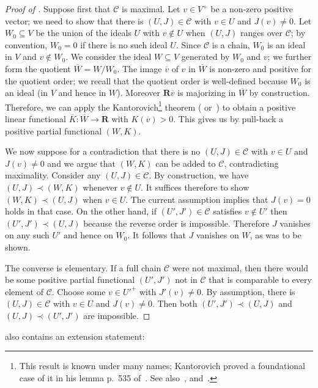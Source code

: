 \documentclass[11pt]{amsart}
\numberwithin{equation}{section}
\theoremstyle{definition}
\theoremstyle{definition}
\newcommand*{\sC}{\mathscr{C}}
\newcommand*{\RR}{\mathbf{R}}
\newcommand*{\se}{\subseteq}
\begin{document}
\begin{proof}[Proof of ]
Suppose first that $\sC$ is maximal. Let $v\in V^+$ be a non-zero positive vector; we need to show that there is $(U, J)\in\sC$ with $v\in U$ and $J(v)\neq 0$. Let $W_0\se V$ be the union of the ideals $U$ with $v\notin U$ when $(U, J)$ ranges over $\sC$; by convention, $W_0=0$ if there is no such ideal $U$. Since $\sC$ is a chain, $W_0$ is an ideal in $V$ and  $v\notin W_0$. We consider the ideal $W\se V$ generated by $W_0$ and $v$; we further form the quotient $\overline W = W/W_0$. The image $\overline v$ of $v$ in $\overline W$ is non-zero and positive for the quotient order; we recall that the quotient order is well-defined because $W_0$ is an ideal (in $V$ and hence in $W$). Moreover $\RR \overline v$ is majorizing in $\overline W$ by construction. Therefore, we can apply the Kantorovich\footnote{This result is known under many names; Kantorovich proved a foundational case of it in his lemma p.~535 of~\cite[\S4]{Kantorovic}. See also~\cite{Krein37}, \cite{Bauer57} and~\cite[\S2]{Namioka57}.} theorem (\cite[Theorem~1.6.1]{Jameson} or~\cite[Theorem~1.36]{Aliprantis-Tourky}) to obtain a positive linear functional $\overline K \colon \overline W \to\RR$ with $K(\overline v) >0$. This gives us by pull-back a positive partial functional $(W, K)$.

We now suppose for a contradiction that there is no $(U, J) \in \sC$ with $v\in U$ and $J(v) \neq 0$ and we argue that $(W, K)$ can be added to $\sC$, contradicting maximality. Consider any $(U, J)\in \sC$.  By construction, we have $(U, J) \prec (W, K)$ whenever $v\notin U$. It suffices therefore to show $(W, K) \prec (U, J)$ when $v\in U$. The current assumption implies that $J(v)=0$ holds in that case. On the other hand, if $(U', J')\in \sC$ satisfies $v\notin U'$ then $(U', J') \prec  (U, J)$ because the reverse order is impossible. Therefore $J$ vanishes on any such $U'$ and hence on $W_0$. It follows that $J$ vanishes on $W$, as was to be shown.

\smallskip
The converse is elementary. If a full chain $\sC$ were not maximal, then there would be some positive partial functional $(U', J')$ not in $\sC$ that is comparable to every element of $\sC$. Choose some $v\in {U'}^+$ with $J'(v)\neq 0$. By assumption, there is $(U, J) \in \sC$ with $v\in U$ and $J(v) \neq 0$. Then both $(U', J') \prec (U, J)$ and $(U, J) \prec (U', J')$ are impossible.
\end{proof}

 also contains an extension statement:
\end{document}
